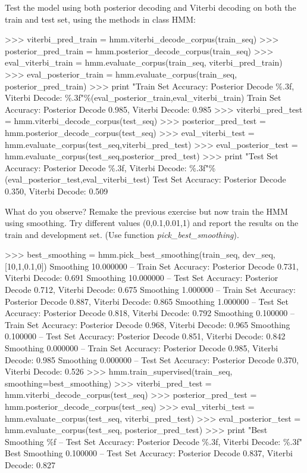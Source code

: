 \begin{exercise}
Test the model using both posterior decoding and Viterbi decoding on
both the train and test set, using the methods in class HMM:
\begin{python}
>>> viterbi_pred_train = hmm.viterbi_decode_corpus(train_seq)
>>> posterior_pred_train = hmm.posterior_decode_corpus(train_seq)
>>> eval_viterbi_train =   hmm.evaluate_corpus(train_seq, viterbi_pred_train)
>>> eval_posterior_train =  hmm.evaluate_corpus(train_seq, posterior_pred_train)
>>> print "Train Set Accuracy: Posterior Decode \%.3f, Viterbi Decode: \%.3f"\%(eval_posterior_train,eval_viterbi_train)
Train Set Accuracy: Posterior Decode 0.985, Viterbi Decode: 0.985
>>> viterbi_pred_test = hmm.viterbi_decode_corpus(test_seq)
>>> posterior_pred_test = hmm.posterior_decode_corpus(test_seq)
>>> eval_viterbi_test =   hmm.evaluate_corpus(test_seq,viterbi_pred_test)
>>> eval_posterior_test = hmm.evaluate_corpus(test_seq,posterior_pred_test)
>>> print "Test Set Accuracy: Posterior Decode \%.3f, Viterbi Decode: \%.3f"\%(eval_posterior_test,eval_viterbi_test)
Test Set Accuracy: Posterior Decode 0.350, Viterbi Decode: 0.509
\end{python}
What do you observe? Remake the previous exercise but now train the HMM
using smoothing. Try different values (0,0.1,0.01,1) and report the results on the
train and development set. (Use function
\emph{pick\_best\_smoothing}).


\begin{python}
>>> best_smoothing = hmm.pick_best_smoothing(train_seq, dev_seq, [10,1,0.1,0])
Smoothing 10.000000 --  Train Set Accuracy: Posterior Decode 0.731, Viterbi Decode: 0.691
Smoothing 10.000000 -- Test Set Accuracy: Posterior Decode 0.712, Viterbi Decode: 0.675
Smoothing 1.000000 --  Train Set Accuracy: Posterior Decode 0.887, Viterbi Decode: 0.865
Smoothing 1.000000 -- Test Set Accuracy: Posterior Decode 0.818, Viterbi Decode: 0.792
Smoothing 0.100000 --  Train Set Accuracy: Posterior Decode 0.968, Viterbi Decode: 0.965
Smoothing 0.100000 -- Test Set Accuracy: Posterior Decode 0.851, Viterbi Decode: 0.842
Smoothing 0.000000 --  Train Set Accuracy: Posterior Decode 0.985, Viterbi Decode: 0.985
Smoothing 0.000000 -- Test Set Accuracy: Posterior Decode 0.370, Viterbi Decode: 0.526
>>> hmm.train_supervised(train_seq, smoothing=best_smoothing)
>>> viterbi_pred_test = hmm.viterbi_decode_corpus(test_seq)
>>> posterior_pred_test = hmm.posterior_decode_corpus(test_seq)
>>> eval_viterbi_test =   hmm.evaluate_corpus(test_seq, viterbi_pred_test)
>>> eval_posterior_test = hmm.evaluate_corpus(test_seq, posterior_pred_test)
>>> print "Best Smoothing \%f --  Test Set Accuracy: Posterior Decode \%.3f, Viterbi Decode: \%.3f"%
Best Smoothing 0.100000 --  Test Set Accuracy: Posterior Decode 0.837, Viterbi Decode: 0.827
\end{python}



\end{exercise}
